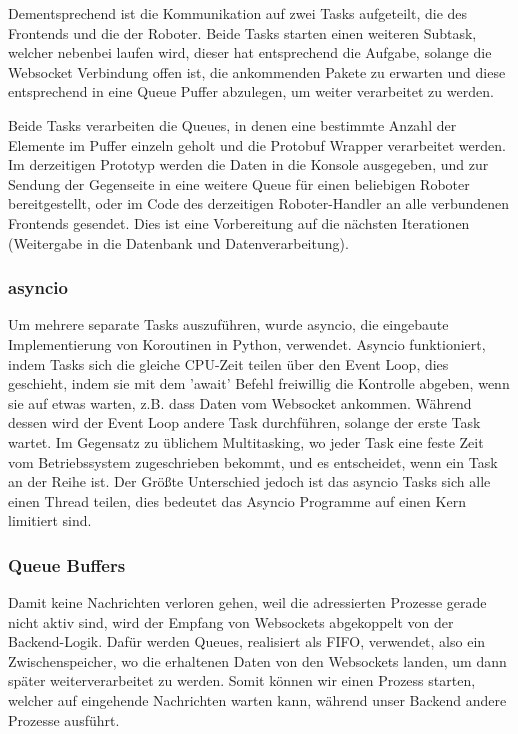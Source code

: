 Dementsprechend ist die Kommunikation auf zwei Tasks aufgeteilt,
die des Frontends und die der Roboter.
% 
Beide Tasks starten einen weiteren Subtask, welcher nebenbei laufen wird, 
dieser hat entsprechend die Aufgabe, 
solange die Websocket Verbindung offen ist,
die ankommenden Pakete zu erwarten 
und diese entsprechend in eine Queue Puffer abzulegen, 
um weiter verarbeitet zu werden. 

Beide Tasks verarbeiten die Queues, 
in denen eine bestimmte Anzahl der Elemente im Puffer 
einzeln geholt und die Protobuf Wrapper verarbeitet werden.
% 
Im derzeitigen Prototyp werden die Daten in die Konsole ausgegeben,
und zur Sendung der Gegenseite in eine weitere Queue 
für einen beliebigen Roboter bereitgestellt, 
oder im Code des derzeitigen Roboter-Handler 
an alle verbundenen Frontends gesendet.
% 
Dies ist eine Vorbereitung auf die nächsten Iterationen 
(Weitergabe in die Datenbank und Datenverarbeitung).


\subsubsection{asyncio}
Um mehrere separate Tasks auszuführen, wurde asyncio,
die eingebaute Implementierung von Koroutinen in Python, verwendet.
% 
Asyncio funktioniert, 
indem Tasks sich die gleiche CPU-Zeit teilen über den Event Loop,
dies geschieht, indem sie mit dem 'await' Befehl freiwillig die Kontrolle abgeben,
wenn sie auf etwas warten, z.B. dass Daten vom Websocket ankommen.
Während dessen wird der Event Loop andere Task durchführen, 
solange der erste Task wartet.
% 
Im Gegensatz zu üblichem Multitasking,
wo jeder Task eine feste Zeit vom Betriebssystem zugeschrieben bekommt, 
und es entscheidet, wenn ein Task an der Reihe ist.
% 
Der Größte Unterschied jedoch ist das asyncio Tasks sich alle einen Thread teilen,
dies bedeutet das Asyncio Programme auf einen Kern limitiert sind.


\subsubsection{Queue Buffers}
Damit keine Nachrichten verloren gehen, 
weil die adressierten Prozesse gerade nicht aktiv sind,  
wird der Empfang von Websockets abgekoppelt von der Backend-Logik.
Dafür werden Queues, realisiert als FIFO, verwendet, also ein Zwischenspeicher, 
wo die erhaltenen Daten von den Websockets landen, 
um dann später weiterverarbeitet zu werden.
% 
Somit können wir einen Prozess starten, 
welcher auf eingehende Nachrichten warten kann,
während unser Backend andere Prozesse ausführt.

